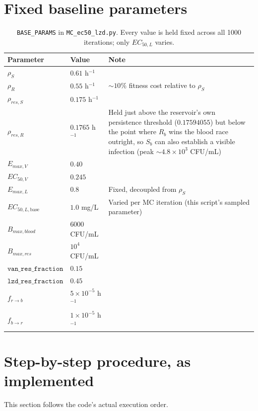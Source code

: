 \documentclass[11pt]{article}
\begin{document}
\section{Fixed baseline parameters}

\begin{table}[h]
\centering
\begin{tabular}{@{}llp{7.2cm}@{}}
\toprule
Parameter & Value & Note \\
\midrule
$\rho_S$ & $0.61$ h$^{-1}$ & \\
$\rho_R$ & $0.55$ h$^{-1}$ & $\sim10\%$ fitness cost relative to $\rho_S$ \\
$\rho_{res,S}$ & $0.175$ h$^{-1}$ & \\
$\rho_{res,R}$ & $0.1765$ h$^{-1}$ & Held just above the reservoir's own persistence threshold ($0.17594055$) but below the point where $R_b$ wins the blood race outright, so $S_b$ can also establish a visible infection (peak $\sim4.8\times10^3$ CFU/mL) \\
$E_{max,V}$ & $0.40$ & \\
$EC_{50,V}$ & $0.245$ & \\
$E_{max,L}$ & $0.8$ & Fixed, decoupled from $\rho_S$ \\
$EC_{50,L,\mathrm{base}}$ & $1.0$ mg/L & Varied per MC iteration (this script's sampled parameter) \\
$B_{max,blood}$ & $6000$ CFU/mL & \\
$B_{max,res}$ & $10^4$ CFU/mL & \\
$\mathtt{van\_res\_fraction}$ & $0.15$ & \\
$\mathtt{lzd\_res\_fraction}$ & $0.45$ & \\
$f_{r\to b}$ & $5\times10^{-5}$ h$^{-1}$ & \\
$f_{b\to r}$ & $1\times10^{-5}$ h$^{-1}$ & \\
\bottomrule
\end{tabular}
\caption{\texttt{BASE\_PARAMS} in \texttt{MC\_ec50\_lzd.py}. Every value is held fixed across all 1000 iterations; only $EC_{50,L}$ varies.}
\end{table}

\section{Step-by-step procedure, as implemented}

This section follows the code's actual execution order.
\end{document}
